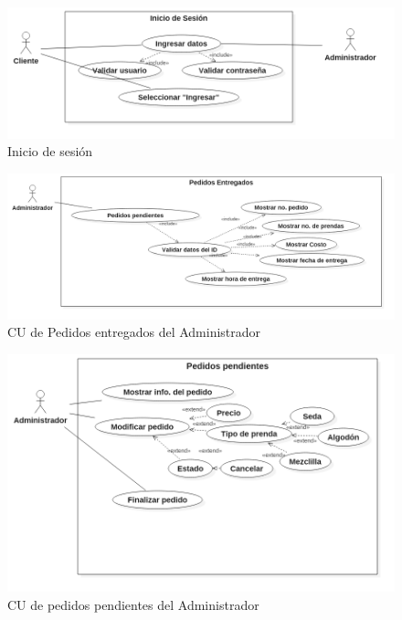 \begin{figure}[htb]
\begin{center}
\includegraphics[width=15cm]{./imagenes/diagramas/CU_IniciarSesion.png}
\end{center}
\caption{Inicio de sesión}
\end{figure}


\begin{figure}[htb]
\begin{center}
\includegraphics[width=15cm]{./imagenes/diagramas/CU_PedidosEntregados(Admin).png}
\end{center}
\caption{CU de Pedidos entregados del Administrador}
\end{figure}


\begin{figure}[htb]
\begin{center}
\includegraphics[width=15cm]{./imagenes/diagramas/CU_PedidosPendientes(Admin).png}
\end{center}
\caption{CU de pedidos pendientes del Administrador}
\end{figure}


